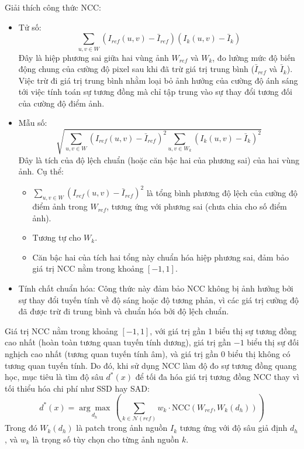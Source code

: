 Giải thích công thức NCC:
\begin{itemize}
    \item Tử số: 
    \begin{equation}
        \sum_{u,v \in W} (I_{ref}(u,v) - \bar{I}_{ref}) (I_k(u,v) - \bar{I}_{k})    
    \end{equation}
    Đây là hiệp phương sai giữa hai vùng ảnh \(W_{ref}\) và \(W_k\), đo lường mức độ biến động chung của cường độ pixel sau khi đã trừ giá trị trung bình (\(\bar{I}_{ref}\) và \(\bar{I}_{k}\)). Việc trừ đi giá trị trung bình nhằm loại bỏ ảnh hưởng của cường độ ánh sáng tới việc tính toán sự tương đồng mà chỉ tập trung vào sự thay đổi tương đối của cường độ điểm ảnh.

    \item Mẫu số:
    \begin{equation}
        \sqrt{\sum_{u,v \in W} (I_{ref}(u,v) - \bar{I}_{ref})^2 \sum_{u,v \in W_k} (I_k(u,v) - \bar{I}_{k})^2}
    \end{equation}
    Đây là tích của độ lệch chuẩn (hoặc căn bậc hai của phương sai) của hai vùng ảnh. Cụ thể:
    \begin{itemize}
        \item \(\sum_{u,v \in W} (I_{ref}(u,v) - \bar{I}_{ref})^2\) là tổng bình phương độ lệch của cường độ điểm ảnh trong \(W_{ref}\), tương ứng với phương sai (chưa chia cho số điểm ảnh).
        \item Tương tự cho \(W_k\).
        \item Căn bậc hai của tích hai tổng này chuẩn hóa hiệp phương sai, đảm bảo giá trị NCC nằm trong khoảng \([-1, 1]\).
    \end{itemize}

    \item Tính chất chuẩn hóa: Công thức này đảm bảo NCC không bị ảnh hưởng bởi sự thay đổi tuyến tính về độ sáng hoặc độ tương phản, vì các giá trị cường độ đã được trừ đi trung bình và chuẩn hóa bởi độ lệch chuẩn.
\end{itemize}

Giá trị NCC nằm trong khoảng $[-1, 1]$, với giá trị gần $1$ biểu thị sự tương đồng cao nhất (hoàn toàn tương quan tuyến tính dương), giá trị gần $-1$ biểu thị sự đối nghịch cao nhất (tương quan tuyến tính âm), và giá trị gần $0$ biểu thị không có tương quan tuyến tính. Do đó, khi sử dụng NCC làm độ đo sự tương đồng quang học, mục tiêu là tìm độ sâu $d^*(x)$ để tối đa hóa giá trị tương đồng NCC thay vì tối thiểu hóa chi phí như SSD hay SAD:
\begin{equation} \label{eq:ncc_maximization}
    d^*(x) = \underset{d_h}{\arg\max} \, \left( \sum_{k \in \mathcal{N}(ref)} w_k \cdot \text{NCC}(W_{ref}, W_k(d_h)) \right)
\end{equation}
Trong đó $W_k(d_h)$ là patch trong ảnh nguồn $I_k$ tương ứng với độ sâu giả định $d_h$, và $w_k$ là trọng số tùy chọn cho từng ảnh nguồn $k$.

